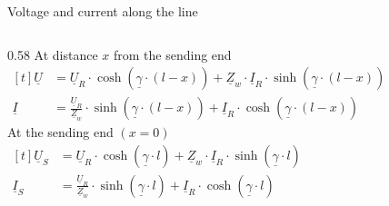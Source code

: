 \begin{frame}{Voltage and current along the line}
  \begin{columns}[c,onlytextwidth]
    \begin{column}{0.38\textwidth}\centering
      }
    \end{column}
    \begin{column}{0.58\textwidth}
      {\footnotesize At distance $x$ from the sending end}\\[0.2em]
      {\footnotesize$\begin{aligned}[t]
        \underline{U} &= \underline{U}_R\cdot
                         \cosh\left(\underline{\gamma}\cdot\left(l-x\right)\right)
                       + \underline{Z}_w\cdot\underline{I}_R\cdot
                         \sinh\left(\underline{\gamma}\cdot\left(l-x\right)\right)\\[0.5em]
        \underline{I} &= \frac{\underline{U}_R}{\underline{Z}_w}\cdot
                         \sinh\left(\underline{\gamma}\cdot\left(l-x\right)\right)
                       + \underline{I}_R\cdot
                         \cosh\left(\underline{\gamma}\cdot\left(l-x\right)\right)
       \end{aligned}$}\\[1.2em]
      {\footnotesize At the sending end $\left(x=0\right)$}\\[0.2em]
      {\footnotesize$\begin{aligned}[t]
        \underline{U}_S &= \underline{U}_R\cdot
                           \cosh\left(\underline{\gamma}\cdot l\right)
                         + \underline{Z}_w\cdot\underline{I}_R\cdot
                           \sinh\left(\underline{\gamma}\cdot l\right)\\[0.5em]
        \underline{I}_S &= \frac{\underline{U}_R}{\underline{Z}_w}\cdot
                           \sinh\left(\underline{\gamma}\cdot l\right)
                         + \underline{I}_R\cdot
                           \cosh\left(\underline{\gamma}\cdot l\right)
       \end{aligned}$}
    \end{column}
  \end{columns}
\end{frame}

